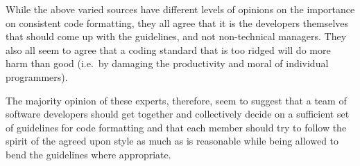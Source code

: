 While the above varied sources have different levels of opinions on the
importance on consistent code formatting, they all agree that it is the
developers themselves that should come up with the guidelines, and not
non-technical managers.  They also all seem to agree that a coding standard
that is too ridged will do more harm than good (i.e.\ by damaging the
productivity and moral of individual programmers).

The majority opinion of these experts, therefore, seem to suggest that a team
of software developers should get together and collectively decide on a
sufficient set of guidelines for code formatting and that each member should
try to follow the spirit of the agreed upon style as much as is reasonable
while being allowed to bend the guidelines where appropriate.
